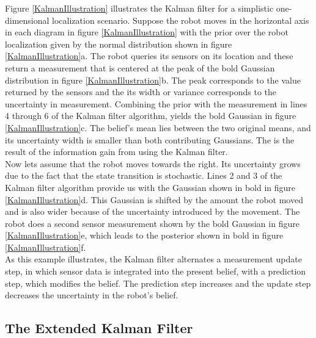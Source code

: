 \documentclass[conference]{IEEEtran}
\begin{document}
Figure \ref{KalmanIllustration} illustrates the Kalman filter for a simplistic one-dimensional localization scenario. Suppose the robot moves in the horizontal axis in each diagram in figure \ref{KalmanIllustration} with the prior over the robot localization given by the normal distribution shown in figure \ref{KalmanIllustration}a. The robot queries its sensors on its location and these return a measurement that is centered at the peak of the bold Gaussian distribution in figure \ref{KalmanIllustration}b. The peak corresponds to the value returned by the sensors and the its width or variance corresponds to the uncertainty in measurement. Combining the prior with the measurement in lines 4 through 6 of the Kalman filter algorithm, yields the bold Gaussian in figure \ref{KalmanIllustration}c. The belief's mean lies between the two original means, and its uncertainty width is smaller than both contributing Gaussians. The is the result of the information gain from using the Kalman filter.\\

Now lets assume that the robot moves towards the right. Its uncertainty grows due to the fact that the state transition is stochastic. Lines 2 and 3 of the Kalman filter algorithm provide us with the Gaussian shown in bold in figure \ref{KalmanIllustration}d. This Gaussian is shifted by the amount the robot moved and is also wider because of the uncertainty introduced by the movement. The robot does a second sensor measurement shown by the bold Gaussian in figure \ref{KalmanIllustration}e, which leads to the posterior shown in bold in figure \ref{KalmanIllustration}f.\\

As this example illustrates, the Kalman filter alternates a measurement update step, in which sensor data is integrated into the present belief, with a prediction step, which modifies the belief. The prediction step increases and the update step decreases the uncertainty in the robot's belief.

\subsection{The Extended Kalman Filter}
\end{document}
